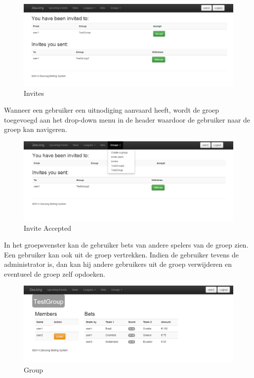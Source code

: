 \documentclass[11pt]{article}
\begin{document}
\begin{figure}[h!]
	\begin{center}
	\includegraphics[scale=0.4]{invites.png}

	\caption{Invites}
	\label{fig:invites}
	\end{center}
\end{figure}

Wanneer een gebruiker een uitnodiging aanvaard heeft, wordt de groep toegevoegd aan het drop-down menu in de header waardoor de gebruiker naar de groep kan navigeren.\\

\begin{figure}[h!]
	\begin{center}
	\includegraphics[scale=0.4]{inviteAccepted.png}

	\caption{Invite Accepted}
	\label{fig:inviteAccepted}
	\end{center}
\end{figure}

In het groepsvenster kan de gebruiker bets van andere spelers van de groep zien.  Een gebruiker kan ook uit de groep vertrekken.  Indien de gebruiker tevens de administrator is, dan kan hij andere gebruikers uit de groep verwijderen en eventueel de groep zelf opdoeken.\\

\begin{figure}[h!]
	\begin{center}
	\includegraphics[scale=0.4]{group.png}

	\caption{Group}
	\label{fig:group}
	\end{center}
\end{figure}
\end{document}

